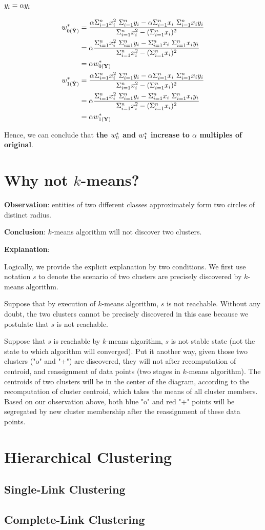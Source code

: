 \documentclass[11pt,a4paper]{article}
\begin{document}
\subsection{$y_i = \alpha y_i$}
\begin{align}
    w_{0(\Yhat)}^* &= \frac{\alpha \sxis \ \sy - \alpha \sxi \ \sxy}{ \sxis -
        (\sxi)^2} \\
    &= \alpha \frac{ \sxis \ \sy - \sxi \ \sxy}{\sxis - (\sxi)^2} \\
        &= \alpha w_{0(\Y)}^* \\
    w_{1(\Yhat)}^* &= \frac{\alpha \sxis \ \sy - \alpha \sxi \ \sxy}{ \sxis -
        (\sxi)^2} \\
    &= \alpha \frac{ \sxis \ \sy - \sxi \ \sxy}{\sxis - (\sxi)^2} \\
        &= \alpha w_{1(\Y)}^* \\
\end{align}

Hence, we can conclude that {\bf the $w_0^*$ and $w_1^*$ increase to $\alpha$
    multiples of original}.

\newpage
\section{Why not $k$-means?}
\textbf{Observation}: entities of two different classes approximately
form two circles of distinct radius. 

\noindent
\textbf{Conclusion}: $k$-means algorithm will not discover two clusters.

\noindent
\textbf{Explanation}: 

Logically, we provide the explicit explanation by two conditions. We first
use notation $s$ to denote the scenario of two clusters are precisely
discovered by $k$-means algorithm.

Suppose that by execution of $k$-means algorithm, $s$ is not reachable.
Without any doubt, the two clusters cannot be precisely discovered in this
case because we postulate that $s$ is not reachable.

Suppose that $s$ is reachable by $k$-means algorithm, $s$ is not stable state
(not the state to which algorithm will converged).  Put it another
way, given those two clusters ("o" and "+") are discovered,
they will not after recomputation of centroid, and reassignment of data points
(two stages in $k$-means algorithm). The centroids of two clusters will be in
the center of the diagram, according to the recomputation of cluster
centroid, which takes the means of all cluster members. Based on our
observation above, both blue "o" and red "+" points will be segregated by new
cluster membership after the reassignment of these data points.

\newpage
\section{Hierarchical Clustering}
\subsection{Single-Link Clustering}

\subsection{Complete-Link Clustering}

\end{document}
